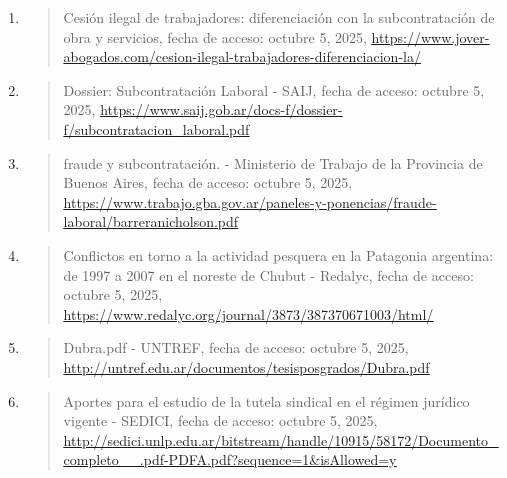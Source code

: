 \documentclass[]{article}
\begin{document}
\begin{enumerate}
\begin{quote}
  \end{quote}
\item
  \begin{quote}
  Cesión ilegal de trabajadores: diferenciación con la subcontratación
  de obra y servicios, fecha de acceso: octubre 5, 2025,
  \href{https://www.jover-abogados.com/cesion-ilegal-trabajadores-diferenciacion-la/}{\uline{https://www.jover-abogados.com/cesion-ilegal-trabajadores-diferenciacion-la/}}
  \end{quote}
\item
  \begin{quote}
  Dossier: Subcontratación Laboral - SAIJ, fecha de acceso: octubre 5,
  2025,
  \href{https://www.saij.gob.ar/docs-f/dossier-f/subcontratacion_laboral.pdf}{\uline{https://www.saij.gob.ar/docs-f/dossier-f/subcontratacion\_laboral.pdf}}
  \end{quote}
\item
  \begin{quote}
  fraude y subcontratación. - Ministerio de Trabajo de la Provincia de
  Buenos Aires, fecha de acceso: octubre 5, 2025,
  \href{https://www.trabajo.gba.gov.ar/paneles-y-ponencias/fraude-laboral/barreranicholson.pdf}{\uline{https://www.trabajo.gba.gov.ar/paneles-y-ponencias/fraude-laboral/barreranicholson.pdf}}
  \end{quote}
\item
  \begin{quote}
  Conflictos en torno a la actividad pesquera en la Patagonia argentina:
  de 1997 a 2007 en el noreste de Chubut - Redalyc, fecha de acceso:
  octubre 5, 2025,
  \href{https://www.redalyc.org/journal/3873/387370671003/html/}{\uline{https://www.redalyc.org/journal/3873/387370671003/html/}}
  \end{quote}
\item
  \begin{quote}
  Dubra.pdf - UNTREF, fecha de acceso: octubre 5, 2025,
  \href{http://untref.edu.ar/documentos/tesisposgrados/Dubra.pdf}{\uline{http://untref.edu.ar/documentos/tesisposgrados/Dubra.pdf}}
  \end{quote}
\item
  \begin{quote}
  Aportes para el estudio de la tutela sindical en el régimen jurídico
  vigente - SEDICI, fecha de acceso: octubre 5, 2025,
  \href{http://sedici.unlp.edu.ar/bitstream/handle/10915/58172/Documento_completo__.pdf-PDFA.pdf?sequence=1\&isAllowed=y}{\uline{http://sedici.unlp.edu.ar/bitstream/handle/10915/58172/Documento\_completo\_\_.pdf-PDFA.pdf?sequence=1\&isAllowed=y}}

\end{quote}
\end{enumerate}
\end{document}
